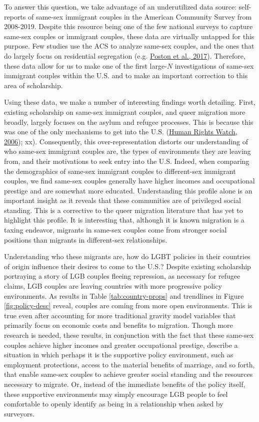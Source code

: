 \documentclass[
  11pt,
]{article}
\begin{document}
To answer this question, we take advantage of an underutilized data source: self-reports of same-sex immigrant couples in the American Community Survey from 2008-2019. Despite this resource being one of the few national surveys to capture same-sex couples or immigrant couples, these data are virtually untapped for this purpose. Few studies use the ACS to analyze same-sex couples, and the ones that do largely focus on residential segregation (e.g. \protect\hyperlink{ref-poston_2017}{Poston et al., 2017}). Therefore, these data allow for us to make one of the first large-\(N\) investigations of same-sex immigrant couples within the U.S. and to make an important correction to this area of scholarship.

Using these data, we make a number of interesting findings worth detailing. First, existing scholarship on same-sex immigrant couples, and queer migration more broadly, largely focuses on the asylum and refugee processes. This is because this was one of the only mechanisms to get into the U.S. (\protect\hyperlink{ref-humanrightswatch_2006}{Human Rights Watch, 2006}); xx). Consequently, this over-representation distorts our understanding of who same-sex immigrant couples are, the types of environments they are leaving from, and their motivations to seek entry into the U.S. Indeed, when comparing the demographics of same-sex immigrant couples to different-sex immigrant couples, we find same-sex couples generally have higher incomes and occupational prestige and are somewhat more educated. Understanding this profile alone is an important insight as it reveals that these communities are of privileged social standing. This is a corrective to the queer migration literature that has yet to highlight this profile. It is interesting that, although it is known migration is a taxing endeavor, migrants in same-sex couples come from stronger social positions than migrants in different-sex relationships.

Understanding who these migrants are, how do LGBT policies in their countries of origin influence their desires to come to the U.S.? Despite existing scholarship portraying a story of LGB couples fleeing repression, as necessary for refugee claims, LGB couples are leaving countries with more progressive policy environments. As results in Table \ref{tab:country-props} and trendlines in Figure \ref{fig:policy-desc} reveal, couples are coming from more open environments. This is true even after accounting for more traditional gravity model variables that primarily focus on economic costs and benefits to migration. Though more research is needed, these results, in conjunction with the fact that these same-sex couples achieve higher incomes and greater occupational prestige, describe a situation in which perhaps it is the supportive policy environment, such as employment protections, access to the material benefits of marriage, and so forth, that enable same-sex couples to achieve greater social standing and the resources necessary to migrate. Or, instead of the immediate benefits of the policy itself, these supportive environments may simply encourage LGB people to feel comfortable to openly identify as being in a relationship when asked by surveyors.
\end{document}
